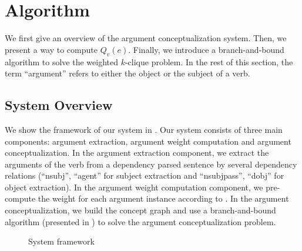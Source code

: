 \section{Algorithm}
\label{sec:algo}

We first give an overview of the argument conceptualization system.
Then, we present a way to compute $Q_v(e)$.
Finally, we introduce a branch-and-bound algorithm to
solve the weighted $k$-clique problem.
In the rest of this section, the term ``argument'' refers to either
the object or the subject of a verb.

\subsection{System Overview}
We show the framework of our system in .
Our system consists of three main components:
argument extraction, argument weight computation and
argument conceptualization.
In the argument extraction component, we extract the arguments
of the verb from a dependency parsed sentence by several
dependency relations (``nsubj'', ``agent''
for subject extraction and ``nsubjpass'', ``dobj'' for object extraction).
In the argument weight computation component,
we pre-compute the weight for each argument instance according
to . In the argument conceptualization, we
build the concept graph and use a branch-and-bound algorithm
(presented in )
to solve the argument conceptualization problem.
\begin{figure}[th]
\centering
{}
\caption{System framework}
\label{fig:system}
\end{figure}

